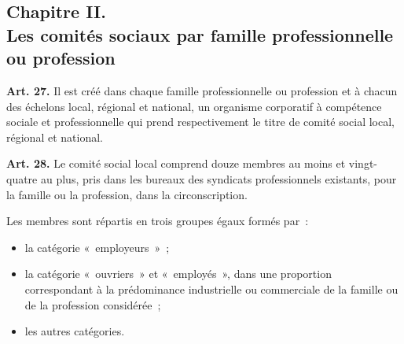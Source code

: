 \documentclass[french,twoside]{book} %
\newcommand{\labelchar}[1]{\textbf{\color{rubric} #1}}
\begin{document}
\subsection[{Chapitre II. Les comités sociaux par famille professionnelle ou profession}]{Chapitre II. \\
Les comités sociaux par famille professionnelle ou profession}

\noindent \labelchar{Art. 27.} Il est créé dans chaque famille professionnelle ou profession et à chacun des échelons local, régional et national, un organisme corporatif à compétence sociale et professionnelle qui prend respectivement le titre de comité social local, régional et national.\par
\bigbreak
\noindent \labelchar{Art. 28.} Le comité social local comprend douze membres au moins et vingt-quatre au plus, pris dans les bureaux des syndicats professionnels existants, pour la famille ou la profession, dans la circonscription.\par
Les membres sont répartis en trois groupes égaux formés par :\par

\begin{itemize}[itemsep=0pt,]
\item la catégorie « employeurs » ;
\item la catégorie « ouvriers » et « employés », dans une proportion correspondant à la prédominance industrielle ou commerciale de la famille ou de la profession considérée ;
\item les autres catégories.
\end{itemize}
\end{document}
